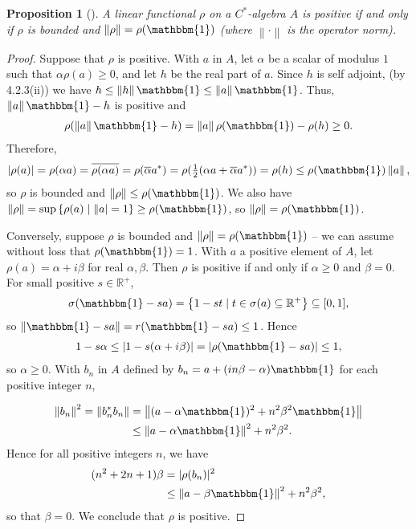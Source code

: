 \documentclass[11pt,a4paper]{report}
\theoremstyle{plain}
\newtheorem{prop}{Proposition}
\theoremstyle{definition}
\newcommand{\1}{\mathbbm{1}}
\newcommand{\R}{\mathbb{R}}
\newcommand{\spec}[1]{\sigma(#1)}
\begin{document}
\begin{prop}[{\cite[4.3.2]{kadison83}}]\label{prop:432}
	A linear functional $\rho$ on a $C^\ast$-algebra $A$ is positive if and only if 
	$\rho$ is bounded and $\left\|\rho\right\| = \rho(\1)$ (where 
	$\left\|\cdot\right\|$ is the operator norm).
\end{prop}
\begin{proof}
	Suppose that $\rho$ is positive. With $a$ in $A$, let $\alpha$ be a scalar of 
	modulus $1$ such that $\alpha\rho(a)\geq 0$, and let $h$ be the real part of 
	$a$. Since $h$ is self adjoint, (by 4.2.3(ii)) we have $h \leq \left\|h\right\|\1 
	\leq \left\|a\right\|\1$. Thus, $\left\|a\right\|\1-h$ is positive and 
	\begin{align*}
		\rho(\left\|a\right\|\1-h) = \left\|a\right\|\rho(\1)-\rho(h) \geq 0.
	\end{align*}
	Therefore,
	\begin{align*}
		|\rho(a)| 	= \rho(\alpha a) = \overline{\rho(\alpha a)} 
					= \rho(\overline{\alpha}a^\ast) 
					= \rho(\tfrac{1}{2}(\alpha a +\overline{\alpha}a^\ast))
					= \rho(h) \leq \rho(\1) \left\|a\right\|,
	\end{align*}
	so $\rho$ is bounded and $\left\|\rho\right\| \leq \rho(\1)$. We also have 
	$\left\|\rho\right\| = \sup\left\{\rho(a) \mid \left\|a\right| = 1\right\} \geq 
	\rho(\1)$, so $\left\|\rho\right\|=\rho(\1)$.

	
	Conversely, suppose $\rho$ is bounded and $\left\|\rho\right\| = \rho(\1)$ -- we 
	can assume without loss that $\rho(\1)=1$. With $a$ a positive element of $A$, 
	let $\rho(a)=\alpha+i\beta$ for real $\alpha,\beta$. Then $\rho$ is positive if 
	and only if $\alpha \geq 0$ and $\beta = 0$.
	For small positive $s \in \R^+$, 
	\begin{align*}
		\spec{\1-sa} = \left\{1-st \mid t\in \spec{a} 
							\subseteq \R^+\right\} \subseteq [0,1],
	\end{align*}
	so $\left\|\1-sa\right\| = r(\1-sa) \leq 1$. Hence
	\begin{align*}
		1-s\alpha \leq |1-s(\alpha+i\beta)| = |\rho(\1 - sa)| \leq 1,
	\end{align*}
	so $\alpha\geq0$. With $b_n$ in $A$ defined by $b_n= a+(in\beta-\alpha)\1$ for 
	each positive integer $n$,

	\begin{align*}
				\left\|b_n\right\|^2 = \left\|b_n^\ast b_n\right\| 
		&= 		\left\|(a-\alpha\1)^2 + n^2\beta^2\1\right\| 								\\
		&\leq 	\left\|a-\alpha\1\right\|^2 +n^2\beta^2.
	\end{align*}
	Hence for all positive integers $n$, we have
	\begin{align*}
				(n^2+2n+1)\beta 
		&=	 	|\rho(b_n)|^2  																\\
		&\leq 	\left\|a-\beta\1\right\|^2 +n^2\beta^2,
	\end{align*}
	so that $\beta=0$. We conclude that $\rho$ is positive.
\end{proof}
\end{document}
